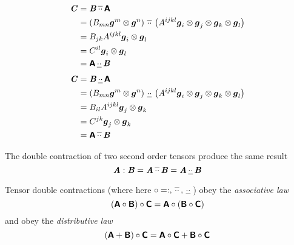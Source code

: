 \begin{equation}
  \begin{aligned}
    \boldsymbol{\mathit{C}}&= \boldsymbol{\mathit{B}} \, \overline{\cdot\cdot} \, \boldsymbol{\mathsf{A}} \\
    &= \left( B_{mn}  \boldsymbol{g} ^{m} \otimes  \boldsymbol{g} ^{n}  \right) \, \overline{\cdot\cdot} \, \left( A^{ijkl}  \boldsymbol{g} _{i} \otimes  \boldsymbol{g} _{j} \otimes  \boldsymbol{g} _{k} \otimes  \boldsymbol{g} _{l}  \right) \\
    &=B_{jk}A^{ijkl}  \boldsymbol{g} _{i} \otimes  \boldsymbol{g} _{l} \\
    &=C^{il}  \boldsymbol{g} _{i} \otimes  \boldsymbol{g} _{l} \\
    &= \boldsymbol{\mathsf{A}} \, \underline{\cdot\cdot} \, \boldsymbol{\mathit{B}} 
  \end{aligned}
\end{equation}
\begin{equation}
  \begin{aligned}
    \boldsymbol{\mathit{C}}&= \boldsymbol{\mathit{B}} \, \underline{\cdot\cdot} \, \boldsymbol{\mathsf{A}} \\
    &= \left( B_{mn}  \boldsymbol{g} ^{m} \otimes  \boldsymbol{g} ^{n}  \right) \, \underline{\cdot\cdot} \, \left( A^{ijkl}  \boldsymbol{g} _{i} \otimes  \boldsymbol{g} _{j} \otimes  \boldsymbol{g} _{k} \otimes  \boldsymbol{g} _{l}  \right) \\
    &=B_{il}A^{ijkl}  \boldsymbol{g} _{j} \otimes  \boldsymbol{g} _{k} \\
    &=C^{jk}  \boldsymbol{g} _{j} \otimes  \boldsymbol{g} _{k}  \\        
    &= \boldsymbol{\mathsf{A}} \, \overline{\cdot\cdot} \, \boldsymbol{\mathit{B}} 
  \end{aligned}
\end{equation}

The double contraction of two second order tensors produce the same result \ie
\begin{equation}
   \boldsymbol{\mathit{A}} : \boldsymbol{\mathit{B}} = \boldsymbol{\mathit{A}} \, \overline{\cdot\cdot} \, \boldsymbol{\mathit{B}} = \boldsymbol{\mathit{A}} \, \underline{\cdot\cdot} \, \boldsymbol{\mathit{B}} 
\end{equation}

Tensor double contractions (where here $\circ =  : ,
 \, \overline{\cdot\cdot} \, ,  \, \underline{\cdot\cdot} \, $) obey the \emph{associative law}
\begin{equation}
  \left( \boldsymbol{\mathsf{A}}\circ\boldsymbol{\mathsf{B}} \right)\circ\boldsymbol{\mathsf{C}}=\boldsymbol{\mathsf{A}}\circ\left( \boldsymbol{\mathsf{B}}\circ\boldsymbol{\mathsf{C}} \right)
\end{equation}
and obey the \emph{distributive law}
\begin{equation}
  \left( \boldsymbol{\mathsf{A}}+\boldsymbol{\mathsf{B}} \right)\circ\boldsymbol{\mathsf{C}}=\boldsymbol{\mathsf{A}}\circ\boldsymbol{\mathsf{C}}+\boldsymbol{\mathsf{B}}\circ\boldsymbol{\mathsf{C}}
\end{equation}

